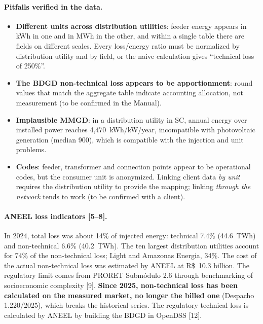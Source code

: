\paragraph{Pitfalls verified in the data.}
\begin{itemize}
  \item \textbf{Different units across distribution utilities}: feeder
    energy appears in kWh in one and in MWh in the other, and within a single
    table there are fields on different scales. Every loss/energy ratio must
    be normalized by distribution utility and by field, or the naive calculation gives
    ``technical loss of 250\%''.
  \item \textbf{The BDGD non-technical loss appears to be apportionment}: round values
    that match the aggregate table indicate accounting allocation, not
    measurement (to be confirmed in the Manual).
  \item \textbf{Implausible MMGD}: in a distribution utility in SC, annual energy
    over installed power reaches 4,470~kWh/kW/year, incompatible with
    photovoltaic generation (median 900), which is compatible with the
    injection and unit problems.
  \item \textbf{Codes}: feeder, transformer and connection points
    appear to be operational codes, but the consumer unit is anonymized.
    Linking client data \emph{by unit} requires the distribution utility to
    provide the mapping; linking \emph{through the network} tends to work (to be
    confirmed with a client).
\end{itemize}

\paragraph{ANEEL loss indicators [5--8].} In 2024, total loss was
about 14\% of injected energy: technical 7.4\% (44.6~TWh) and non-technical
6.6\% (40.2~TWh). The ten largest distribution utilities account for 74\% of the
non-technical loss; Light and Amazonas Energia, 34\%. The cost of the actual non-technical loss was
estimated by ANEEL at R\$~10.3 billion. The regulatory limit comes from PRORET Submódulo
2.6 through benchmarking of socioeconomic complexity [9]. \textbf{Since 2025,
non-technical loss has been calculated on the measured market, no longer the
billed one} (Despacho 1.220/2025), which breaks the historical series. The regulatory
technical loss is calculated by ANEEL by building the BDGD in OpenDSS [12].

